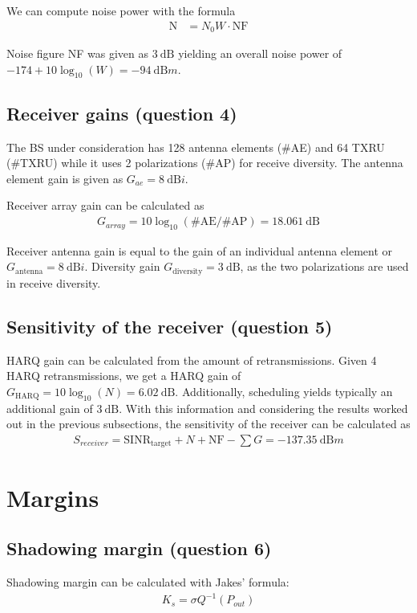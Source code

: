 \documentclass{article}
\begin{document}
We can compute noise power with the formula 
\begin{align*}
     \mathrm{N} &= N_0 W \cdot \mathrm{NF}
\end{align*}

Noise figure NF was given as \(\SI{3}{\deci\bel}\) yielding an overall noise power of \(-174 + 10 \log_{10} (W) = \SI{-94}{\deci\bel m}\).

\subsection{Receiver gains (question 4)}

The BS under consideration has 128 antenna elements (\#AE) and 64 TXRU (\#TXRU) while it uses 2 polarizations (\#AP) for receive diversity. The antenna element gain is given as \(G_{ae} =  \SI{8}{\deci\bel i}\).

Receiver array gain can be calculated as
\begin{align*}
    G_{array} = 10 \log_{10} (\mathrm{\#AE}/\mathrm{\#AP}) = \SI{18.061}{\deci\bel}
\end{align*}

Receiver antenna gain is equal to the gain of an individual antenna element or \(G_{\mathrm{antenna}} = \SI{8}{\deci\bel i}\). Diversity gain \(G_{\mathrm{diversity}} = \SI{3}{\deci\bel}\), as the two polarizations are used in receive diversity.

\subsection{Sensitivity of the receiver (question 5)}

HARQ gain can be calculated from the amount of retransmissions. Given 4 HARQ retransmissions, we get a HARQ gain of \(G_{\mathrm{HARQ}} = 10 \log_{10} (N) = \SI{6.02}{\deci\bel}\). Additionally, scheduling yields typically an additional gain of  \(\SI{3}{\deci\bel}\). With this information and considering the results worked out in the previous subsections, the sensitivity of the receiver can be calculated as
\begin{align*}
    S_{receiver} = \mathrm{SINR_{target}} + N + \mathrm{NF} - \sum G = \SI{-137.35}{\deci\bel m}
\end{align*}

\section{Margins}
\subsection{Shadowing margin (question 6)}
Shadowing margin can be calculated with Jakes' formula:
\begin{align*}
      K_s= \sigma Q^{-1}(P_{out})
\end{align*}
\end{document}
